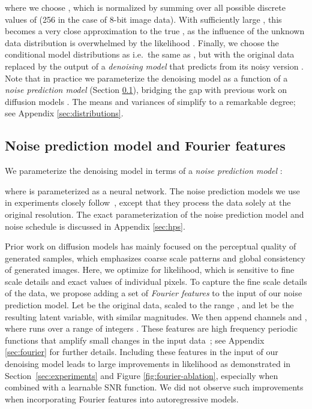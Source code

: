 \documentclass{article}
\begin{document}
where we choose , which is normalized by summing over all possible discrete values of  (256 in the case of 8-bit image data). With sufficiently large , this becomes a very close approximation to the true , as the influence of the unknown data distribution  is overwhelmed by the likelihood .
Finally, we choose the conditional model distributions as 
i.e.\ the same as , but with the original data  replaced by the output of a \emph{denoising model}  that predicts  from its noisy version . Note that in practice we parameterize the denoising model as a function of a \emph{noise prediction model} (Section \ref{sec:noisepred}), bridging the gap with previous work on diffusion models \citep{ho2020denoising}. The means and variances of  simplify to a remarkable degree; see Appendix \ref{sec:distributions}. 

\subsection{Noise prediction model and Fourier features}
\label{sec:noisepred}

We parameterize the denoising model in terms of a \emph{noise prediction model} :

where  is parameterized as a neural network. The noise prediction models we use in experiments closely follow~\cite{ho2020denoising}, except that they process the data solely at the original resolution. The exact parameterization of the noise prediction model and noise schedule is discussed in Appendix \ref{sec:hps}.

Prior work on diffusion models has mainly focused on the perceptual quality of generated samples, which emphasizes coarse scale patterns and global consistency of generated images. Here, we optimize for likelihood, which is sensitive to fine scale details and exact values of individual pixels.  To capture the fine scale details of the data, we propose adding a set of \emph{Fourier features} to the input of our noise prediction model. Let  be the original data, scaled to the range , and let  be the resulting latent variable, with similar magnitudes. We then append channels  and , where  runs over a range of integers . These features are high frequency periodic functions that amplify small changes in the input data~; see Appendix \ref{sec:fourier} for further details.
Including these features in the input of our denoising model leads to large improvements in likelihood as demonstrated in Section~\ref{sec:experiments} and Figure \ref{fig:fourier-ablation}, especially when combined with a learnable SNR function. We did not observe such improvements when incorporating Fourier features into autoregressive models.
\end{document}
